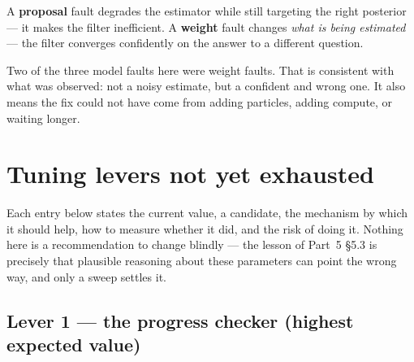 \documentclass[11pt,a4paper]{report}
\begin{document}
\begin{keyidea}
A \textbf{proposal} fault degrades the estimator while still targeting the
right posterior --- it makes the filter inefficient. A \textbf{weight} fault
changes \emph{what is being estimated} --- the filter converges confidently on
the answer to a different question.

Two of the three model faults here were weight faults. That is consistent with
what was observed: not a noisy estimate, but a confident and wrong one. It also
means the fix could not have come from adding particles, adding compute, or
waiting longer.
\end{keyidea}

\section{Tuning levers not yet exhausted}

Each entry below states the current value, a candidate, the mechanism by which
it should help, how to measure whether it did, and the risk of doing it.
Nothing here is a recommendation to change blindly --- the lesson of Part~5
\S5.3 is precisely that plausible reasoning about these parameters can point
the wrong way, and only a sweep settles it.

\subsection{Lever 1 --- the progress checker (highest expected value)}
\end{document}
